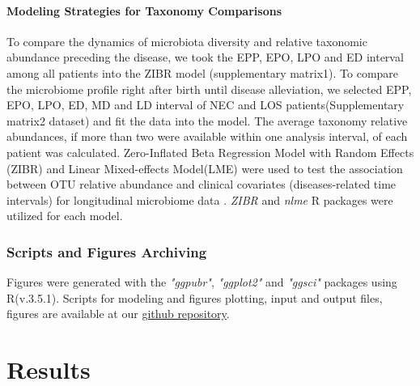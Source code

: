 \documentclass[fleqn,10pt]{wlpeerj} %
\begin{document}
      \paragraph*{Modeling Strategies for Taxonomy Comparisons}
      To compare the dynamics of microbiota diversity and relative taxonomic abundance preceding the disease, we took the EPP, EPO, LPO and ED interval among all patients into the ZIBR model (supplementary matrix1).
      To compare the microbiome profile right after birth until disease alleviation, we selected EPP, EPO, LPO, ED, MD and LD interval of NEC and LOS patients(Supplementary matrix2 dataset) and fit the data into the model.
      The average taxonomy relative abundances, if more than two were available within one analysis interval, of each patient was calculated.
      Zero-Inflated Beta Regression Model with Random Effects (ZIBR) and Linear Mixed-effects Model(LME) were used to test the association between OTU relative abundance and clinical covariates (diseases-related time intervals) for longitudinal microbiome data \citep{chen2016two}. \textit{ZIBR} and \textit{nlme}\citep{nlme} R packages were utilized for each model.

    \subsubsection*{Scripts and Figures Archiving}
    Figures were generated with the \textit{"ggpubr"}\citep{kassambara2017ggpubr},  \textit{"ggplot2"}\citep{ggplot2} and \textit{"ggsci"}\citep{ggsci} packages using R(v.3.5.1).
    Scripts for modeling and figures plotting, input and output files, figures are available at our \href{https://github.com/jiayiliujiayi/NEC-LOS-microbiota_pattern_comparison}{github repository}.



\section*{Results}
\end{document}
